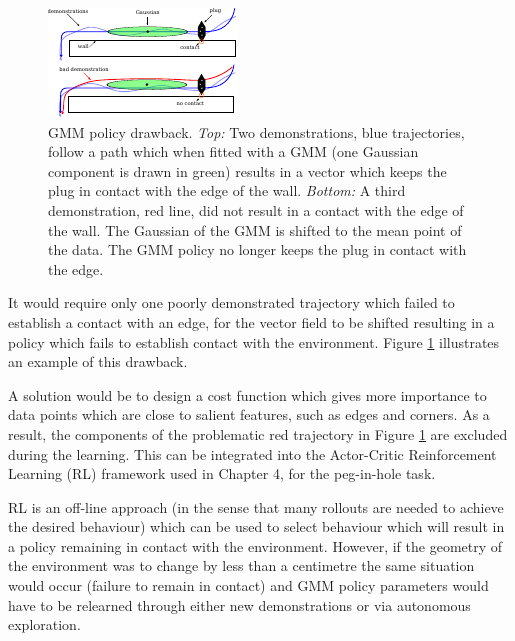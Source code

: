 \begin{figure}[h]
  \centering
  \includegraphics[width=0.9\linewidth]{./ch6-conclusion/Figures/gmm_problem.pdf}
  \caption{GMM policy drawback. \textit{Top:} Two demonstrations, blue trajectories, follow a path
  which when fitted with a GMM (one Gaussian component is drawn in green) results in a vector which keeps the plug 
  in contact with the edge of the wall. \textit{Bottom:} A third demonstration, red line, 
  did not result in a contact with the edge of the wall. The Gaussian of the GMM is shifted to the 
  mean point of the data. The GMM policy no longer keeps the plug in contact with the edge.
  }
  \label{fig:ch6:gmm_traj}
\end{figure}

It would require only one poorly demonstrated trajectory which failed to establish a contact with an edge, 
for the vector field to be shifted resulting in a policy which fails to establish
contact with the environment. Figure \ref{fig:ch6:gmm_traj} illustrates an example of this drawback.

A solution would be to design a cost function which gives more importance to data points which are close 
to salient features, such as edges and corners. As a result, the components of the problematic red trajectory in Figure 
\ref{fig:ch6:gmm_traj} are excluded during the learning. This can be integrated into the 
Actor-Critic Reinforcement Learning (RL) framework used in Chapter 4, for the peg-in-hole task.

RL is an off-line approach (in the sense that many rollouts are needed to achieve the desired behaviour) 
which can be used to select behaviour which will result in a policy remaining in contact with the environment. 
However, if the geometry of the environment was to change by less than a centimetre the same situation would occur 
(failure to remain in contact) and GMM policy parameters would have to be relearned through either new demonstrations or 
via autonomous exploration.

